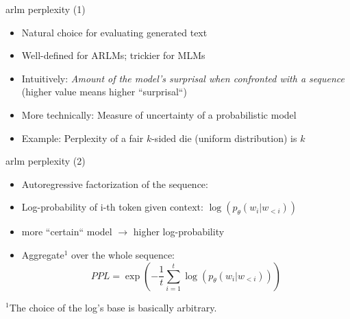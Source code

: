 \begin{frame}{arlm perplexity (1)}

\vfill

\begin{itemize}
	\item Natural choice for evaluating generated text
	\item Well-defined for ARLMs; trickier for MLMs
	\item Intuitively: \textit{Amount of the model's surprisal when confronted with a sequence} (higher value means higher ``surprisal``)
	\item More technically: Measure of uncertainty of a probabilistic model
	\item Example: Perplexity of a fair $k$-sided die (uniform distribution) is $k$
\end{itemize}

\vfill

\end{frame}


\begin{frame}{arlm perplexity (2)}

\vfill
\begin{itemize}
	\item Autoregressive factorization of the sequence:
\end{itemize}

\begin{figure}
    \centering
\end{figure}

\begin{itemize}
	\item Log-probability of i-th token given context: $\log(p_\theta(w_i|w_{<i}))$
	\item[] more ``certain`` model $\to$ higher log-probability
	\item Aggregate$^1$ over the whole sequence:
				$$PPL = \exp\left(- \frac{1}{t} \sum_{i=1}^t \log(p_\theta(w_i|w_{<i}))\right)$$
\end{itemize}

\vfill

\footnotesize{$^1$The choice of the log’s base is basically arbitrary.}

\end{frame}

